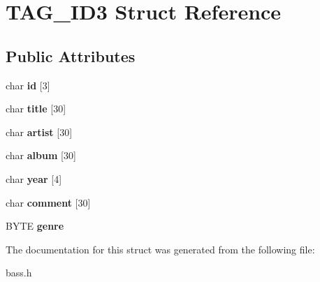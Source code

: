 \section{T\+A\+G\+\_\+\+I\+D3 Struct Reference}
\label{struct_t_a_g___i_d3}
\subsection*{Public Attributes}
\begin{DoxyCompactItemize}
\item 
char {\bfseries id} [3]\label{struct_t_a_g___i_d3_a64073f8c2857123f2aa2b0d55ff55ee1}

\item 
char {\bfseries title} [30]\label{struct_t_a_g___i_d3_a9b704897c67d7c9d774dffefc0bdb8a4}

\item 
char {\bfseries artist} [30]\label{struct_t_a_g___i_d3_ae3c5faab5dae9cdac4776c56ba03fc4a}

\item 
char {\bfseries album} [30]\label{struct_t_a_g___i_d3_a77cda3af3c4457fd723a6316ea9ec58d}

\item 
char {\bfseries year} [4]\label{struct_t_a_g___i_d3_aca8533031988d134be6d738b8e09c223}

\item 
char {\bfseries comment} [30]\label{struct_t_a_g___i_d3_a2a91c7b5288472b8959b51c17320131f}

\item 
B\+Y\+T\+E {\bfseries genre}\label{struct_t_a_g___i_d3_af7a5412ae2d2acafd300dca3212dbbc2}

\end{DoxyCompactItemize}


The documentation for this struct was generated from the following file\+:\begin{DoxyCompactItemize}
\item 
bass.\+h\end{DoxyCompactItemize}
